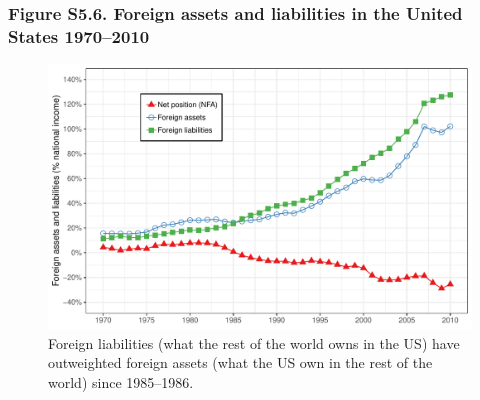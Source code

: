 \documentclass[t]{beamer}\usepackage[]{graphicx}\usepackage[]{color}
\makeatletter
\def\maxwidth{ %
  \ifdim\Gin@nat@width>\linewidth
    \linewidth
  \else
    \Gin@nat@width
  \fi
}
\newenvironment{knitrout}{}{} %
\makeatother
\begin{document}
\begin{frame}[label=Figure_S5_6]
\frametitle{Figure S5.6. Foreign assets and liabilities in the United States 1970--2010}
\begin{figure}[t]
\begin{minipage}[b]{\textwidth}
\centering
\begin{knitrout}\footnotesize
{}\color{fgcolor}

{\centering \includegraphics[width=\maxwidth]{figures/color/Figure_S5_6} 

}



\end{knitrout}
\caption{Foreign liabilities (what the rest of the world owns in the US) have outweighted foreign assets (what the US own in the rest of the world) since 1985--1986.}
\end{minipage}
\end{figure}
\end{frame}
\end{document}
